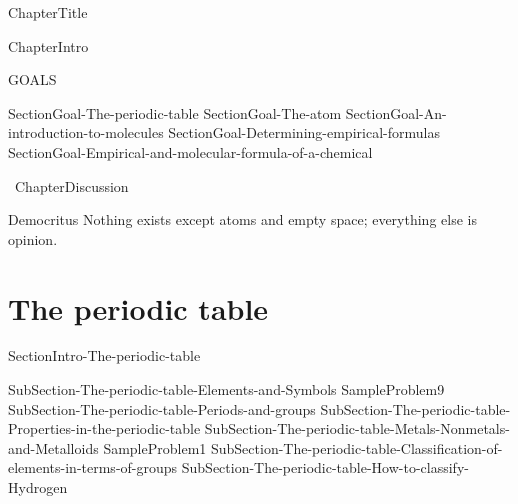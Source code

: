 \documentclass[main.tex]{subfiles}
\newcommand\chapterlabel{Ch-Table}\setcounter{figurenewcounter}{0}\setcounter{tablenewcounter}{0}\setcounter{formulanewcounter}{0}
\begin{document}
\linenumbers
 {ChapterTitle}
 
 
 
\begin{marginfigure}
      \texttt{[image: ../\{\\chapterlabel]}/figure1}
   \end{marginfigure}
   
 {ChapterIntro}
\begin{marginfigure}%
\begin{mytcbox}{GOALS}
\begin{enumerate}[label=\protect\circled{\color{white}\arabic*}]
  {SectionGoal-The-periodic-table}
 {SectionGoal-The-atom}
  {SectionGoal-An-introduction-to-molecules}
 {SectionGoal-Determining-empirical-formulas}
 {SectionGoal-Empirical-and-molecular-formula-of-a-chemical}
\end{enumerate}
\end{mytcbox}
\vspace{1cm}
\begin{tcolorbox}[enhanced,colback=red!5!white,colframe=black!50!red,boxrule=1pt,
  arc=0pt,outer arc=0pt,drop heavy lifted shadow]
\faGears\ 
 {ChapterDiscussion}
 \end{tcolorbox}
\vspace{1cm}    
\begin{shadequote}[l]{Democritus}
Nothing exists except atoms and empty space; everything else is opinion.
\end{shadequote}   
\end{marginfigure}%

\section{The periodic table}{SectionIntro-The-periodic-table}
\sloppy\begin{description}
{SubSection-The-periodic-table-Elements-and-Symbols}
{SampleProblem9}
{SubSection-The-periodic-table-Periods-and-groups}
{SubSection-The-periodic-table-Properties-in-the-periodic-table}
{SubSection-The-periodic-table-Metals-Nonmetals-and-Metalloids}
{SampleProblem1}
{SubSection-The-periodic-table-Classification-of-elements-in-terms-of-groups}
{SubSection-The-periodic-table-How-to-classify-Hydrogen}
 \hspace{0cm}{Figure-The-periodic-table}
 \end{description}
\end{document}
